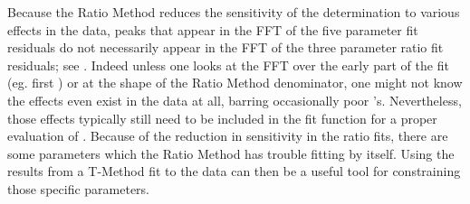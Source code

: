 
Because the Ratio Method reduces the sensitivity of the \wa determination to various effects in the data, peaks that appear in the FFT of the five parameter fit residuals do not necessarily appear in the FFT of the three parameter ratio fit residuals; see . Indeed unless one looks at the FFT over the early part of the fit (eg. first ) or at the shape of the Ratio Method denominator, one might not know the effects even exist in the data at all, barring occasionally poor \chisq's. Nevertheless, those effects typically still need to be included in the fit function for a proper evaluation of \wa. Because of the reduction in sensitivity in the ratio fits, there are some parameters which the Ratio Method has trouble fitting by itself. Using the results from a T-Method fit to the data can then be a useful tool for constraining those specific parameters.


